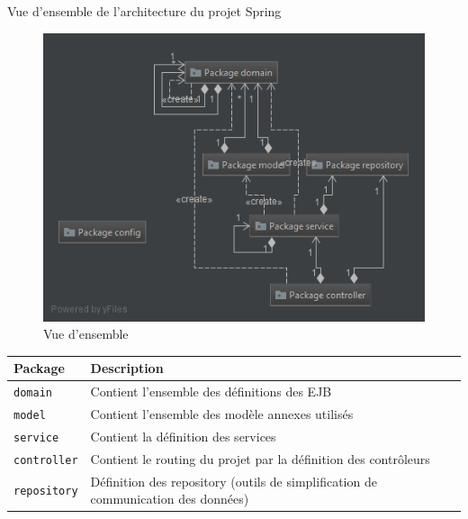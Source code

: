 \documentclass[a4paper]{article}
\makeatletter
\renewcommand{\section}{\@startsection{section}{1}{\z@}
{-4ex \@plus -1ex \@minus -.4ex}
{1ex \@plus.2ex }
{\normalfont\large\sffamily\bfseries}}
\renewcommand{\arraystretch}{1.5}
\makeatother
\begin{document}
\newpage

\vspace*{0.5cm}

\section{Vue d'ensemble de l'architecture du projet Spring}
\begin{figure}[h]
\centering
\includegraphics[scale=.8]{resources/diag_architecture.png}
\caption{Vue d'ensemble}
\end{figure}

\begin{table}[h]
	\centering
	\def\arraystretch{1.4}
	\begin{tabular}{|l|l|l|}
		\hline
		\textbf{Package} & \textbf{Description}\\
		\hline
		\texttt{domain} & Contient l'ensemble des définitions des EJB\\
	  \hline
		\texttt{model} & Contient l'ensemble des modèle annexes utilisés\\
	  \hline
		\texttt{service} & Contient la définition des services\\
	  \hline
		\texttt{controller} & Contient le routing du projet par la définition des contrôleurs\\
	  \hline
		\texttt{repository} & Définition des repository (outils de simplification de communication des données)\\
	  \hline
	\end{tabular}
\end{table}
\end{document}
